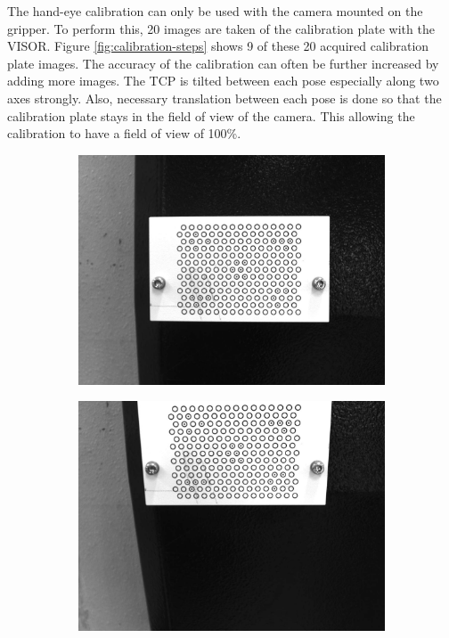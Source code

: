 The hand-eye calibration can only be used with the camera
mounted on the gripper. To perform this, 20 images are taken of the calibration plate with the
VISOR. Figure \ref{fig:calibration-steps}  shows 9 of these 20 acquired calibration plate images. The accuracy of the calibration can often be further increased by adding more images. The TCP is tilted between each pose especially along two axes strongly. Also, necessary translation between each pose is done so that the calibration plate stays in the field of view of the camera. This allowing the calibration to have a field of view of 100\%.



\begin{figure}[h]
    \centering
    \begin{subfigure}{0.32\textwidth}
        \centering
        \includegraphics[width=\textwidth]{figures/001calibration/calibration.png}
    \end{subfigure}\hspace{0cm}
    \begin{subfigure}{0.32\textwidth}
        \centering
        \includegraphics[width=\textwidth]{figures/001calibration/calibration1.png}

\end{subfigure}
\end{figure}
